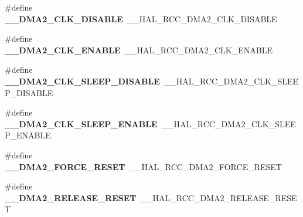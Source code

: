 \begin{DoxyCompactItemize}
\item 
\hypertarget{group___h_a_l___r_c_c___aliased_ga3666b12e99818df90eca5d8c53376d0f}{\#define {\bfseries \-\_\-\-\_\-\-D\-M\-A2\-\_\-\-C\-L\-K\-\_\-\-D\-I\-S\-A\-B\-L\-E}~\-\_\-\-\_\-\-H\-A\-L\-\_\-\-R\-C\-C\-\_\-\-D\-M\-A2\-\_\-\-C\-L\-K\-\_\-\-D\-I\-S\-A\-B\-L\-E}\label{group___h_a_l___r_c_c___aliased_ga3666b12e99818df90eca5d8c53376d0f}

\item 
\hypertarget{group___h_a_l___r_c_c___aliased_gac2d5e13fd9b6bf9608a8fdba50558dce}{\#define {\bfseries \-\_\-\-\_\-\-D\-M\-A2\-\_\-\-C\-L\-K\-\_\-\-E\-N\-A\-B\-L\-E}~\-\_\-\-\_\-\-H\-A\-L\-\_\-\-R\-C\-C\-\_\-\-D\-M\-A2\-\_\-\-C\-L\-K\-\_\-\-E\-N\-A\-B\-L\-E}\label{group___h_a_l___r_c_c___aliased_gac2d5e13fd9b6bf9608a8fdba50558dce}

\item 
\hypertarget{group___h_a_l___r_c_c___aliased_ga6ac46665d831d56d75994809778459ce}{\#define {\bfseries \-\_\-\-\_\-\-D\-M\-A2\-\_\-\-C\-L\-K\-\_\-\-S\-L\-E\-E\-P\-\_\-\-D\-I\-S\-A\-B\-L\-E}~\-\_\-\-\_\-\-H\-A\-L\-\_\-\-R\-C\-C\-\_\-\-D\-M\-A2\-\_\-\-C\-L\-K\-\_\-\-S\-L\-E\-E\-P\-\_\-\-D\-I\-S\-A\-B\-L\-E}\label{group___h_a_l___r_c_c___aliased_ga6ac46665d831d56d75994809778459ce}

\item 
\hypertarget{group___h_a_l___r_c_c___aliased_gaf81a26ac7c46c241b8c8c38194bca9e2}{\#define {\bfseries \-\_\-\-\_\-\-D\-M\-A2\-\_\-\-C\-L\-K\-\_\-\-S\-L\-E\-E\-P\-\_\-\-E\-N\-A\-B\-L\-E}~\-\_\-\-\_\-\-H\-A\-L\-\_\-\-R\-C\-C\-\_\-\-D\-M\-A2\-\_\-\-C\-L\-K\-\_\-\-S\-L\-E\-E\-P\-\_\-\-E\-N\-A\-B\-L\-E}\label{group___h_a_l___r_c_c___aliased_gaf81a26ac7c46c241b8c8c38194bca9e2}

\item 
\hypertarget{group___h_a_l___r_c_c___aliased_gac4c41afd72bb5ab0fe1da7f4444ff213}{\#define {\bfseries \-\_\-\-\_\-\-D\-M\-A2\-\_\-\-F\-O\-R\-C\-E\-\_\-\-R\-E\-S\-E\-T}~\-\_\-\-\_\-\-H\-A\-L\-\_\-\-R\-C\-C\-\_\-\-D\-M\-A2\-\_\-\-F\-O\-R\-C\-E\-\_\-\-R\-E\-S\-E\-T}\label{group___h_a_l___r_c_c___aliased_gac4c41afd72bb5ab0fe1da7f4444ff213}

\item 
\hypertarget{group___h_a_l___r_c_c___aliased_gaea54267740103243fa99cba644aaffcc}{\#define {\bfseries \-\_\-\-\_\-\-D\-M\-A2\-\_\-\-R\-E\-L\-E\-A\-S\-E\-\_\-\-R\-E\-S\-E\-T}~\-\_\-\-\_\-\-H\-A\-L\-\_\-\-R\-C\-C\-\_\-\-D\-M\-A2\-\_\-\-R\-E\-L\-E\-A\-S\-E\-\_\-\-R\-E\-S\-E\-T}\label{group___h_a_l___r_c_c___aliased_gaea54267740103243fa99cba644aaffcc}


\end{DoxyCompactItemize}
